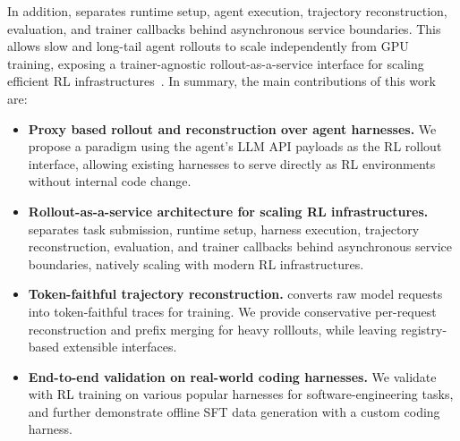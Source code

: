 In addition, \polar separates runtime setup, agent execution, trajectory reconstruction, evaluation, and trainer callbacks behind asynchronous service boundaries. This allows slow and long-tail agent rollouts to scale independently from GPU training, exposing a trainer-agnostic rollout-as-a-service interface for scaling efficient RL infrastructures~\citep{prorlagent2026}.
In summary, the main contributions of this work are:
\begin{itemize}
    \item \textbf{Proxy based rollout and reconstruction over agent harnesses.}
    We propose a paradigm using the agent's LLM API payloads as the RL rollout interface, allowing existing harnesses to serve directly as RL environments without internal code change.
    
    \item \textbf{Rollout-as-a-service architecture for scaling RL infrastructures.}
    \polar separates task submission, runtime setup, harness execution, trajectory reconstruction, evaluation, and trainer callbacks behind asynchronous service boundaries, natively scaling with modern RL infrastructures.

    \item \textbf{Token-faithful trajectory reconstruction.}
    \polar converts raw model requests into token-faithful traces for training. We provide conservative per-request reconstruction and prefix merging for heavy rolllouts, while leaving registry-based extensible interfaces.

    \item \textbf{End-to-end validation on real-world coding harnesses.}
    We validate \polar with RL training on various popular harnesses for software-engineering tasks, and further demonstrate offline SFT data generation with a custom coding harness.
\end{itemize}
